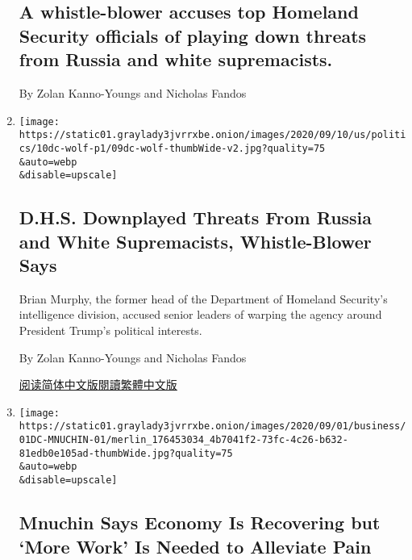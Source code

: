 \begin{enumerate}
  \hypertarget{a-whistle-blower-accuses-top-homeland-security-officials-of-playing-down-threats-from-russia-and-white-supremacists}{%
  \subsection{A whistle-blower accuses top Homeland Security officials
  of playing down threats from Russia and white
  supremacists.}\label{a-whistle-blower-accuses-top-homeland-security-officials-of-playing-down-threats-from-russia-and-white-supremacists}}

  By Zolan Kanno-Youngs and Nicholas Fandos
\item
  \href{/2020/09/09/us/politics/homeland-security-russia-trump.html}{}

  \texttt{[image: https://static01.graylady3jvrrxbe.onion/images/2020/09/10/us/politics/10dc-wolf-p1/09dc-wolf-thumbWide-v2.jpg?quality=75\\\&auto=webp\\\&disable=upscale]}

  \hypertarget{dhs-downplayed-threats-from-russia-and-white-supremacists-whistle-blower-says}{%
  \subsection{D.H.S. Downplayed Threats From Russia and White
  Supremacists, Whistle-Blower
  Says}\label{dhs-downplayed-threats-from-russia-and-white-supremacists-whistle-blower-says}}

  Brian Murphy, the former head of the Department of Homeland Security's
  intelligence division, accused senior leaders of warping the agency
  around President Trump's political interests.

  By Zolan Kanno-Youngs and Nicholas Fandos

  \href{https://cn.nytimes3xbfgragh.onion/usa/20200910/homeland-security-russia-trump/}{阅读简体中文版}\href{https://cn.nytimes3xbfgragh.onion/usa/20200910/homeland-security-russia-trump/zh-hant/}{閱讀繁體中文版}
\item
  \href{/2020/09/01/business/economy/mnuchin-coronavirus.html}{}

  \texttt{[image: https://static01.graylady3jvrrxbe.onion/images/2020/09/01/business/01DC-MNUCHIN-01/merlin\_176453034\_4b7041f2-73fc-4c26-b632-81edb0e105ad-thumbWide.jpg?quality=75\\\&auto=webp\\\&disable=upscale]}

  \hypertarget{mnuchin-says-economy-is-recovering-but-more-work-is-needed-to-alleviate-pain}{%
  \subsection{Mnuchin Says Economy Is Recovering but `More Work' Is
  Needed to Alleviate
  Pain}\label{mnuchin-says-economy-is-recovering-but-more-work-is-needed-to-alleviate-pain}}


\end{enumerate}
